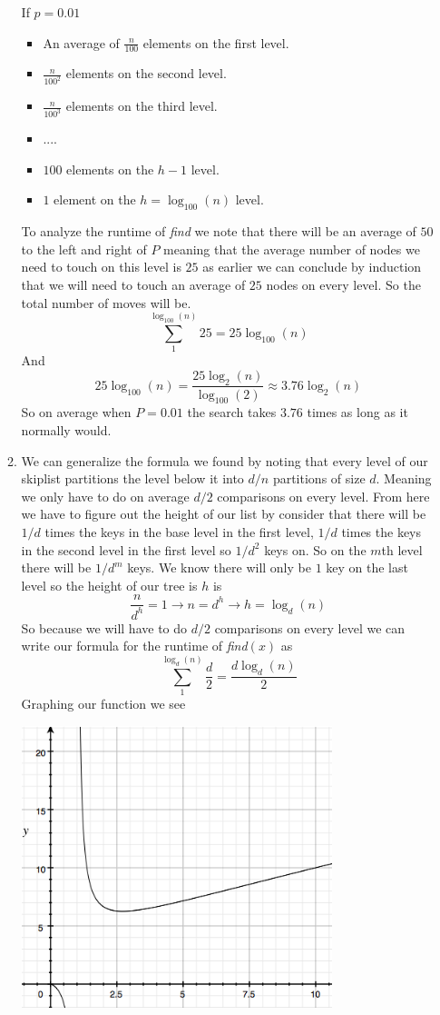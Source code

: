 \documentclass[11pt]{article}
\begin{document}
\begin{enumerate}
\begin{enumerate}
\begin{itemize}
		\end{itemize}
		If $p = 0.01$ 
		\begin{itemize}
		\item An average of $\frac{n}{100}$ elements on the first level.
		\item $\frac{n}{100^2}$ elements on the second level.
		\item $\frac{n}{100^3}$ elements on the third level.
		\item ....
		\item $100$ elements on the $h -1$ level.
		\item $1$ element on the $h = \log_{100}(n)$ level.
		\end{itemize}
			To analyze the runtime
			of \textit{find} we note that there will be an average
			of $50$ to the left and right of $P$ meaning that the
			average number of nodes we need to touch on this level
			is $25$ as earlier we can conclude by induction that we
			will need to touch an average of $25$ nodes on every
			level. So the total number of moves will be.
				$$\sum_1^{\log_{100}(n)}25 = 25\log_{100}(n) $$
			And 
			$$25\log_{100}(n) = \frac{25 \log_2(n)}{\log_{100}(2)}
			\approx 3.76\log_2(n)$$
			So on average when $P = 0.01$ the search takes $3.76$
			times as long as it normally would.
		\item We can generalize the formula we found by noting that every level of
			our skiplist partitions the level below it into $d/n$
			partitions of size $d$. Meaning we only have to do on
			average $d/2$ comparisons on every level. 
			From here we have to figure out the height of our list
			by consider that there will be $1/d$ times the keys in
			the base level in the first level, $1/d$ times the keys
			in the second level in the first level so $1/d^2$ keys
			on. So on the $m$th level there will be $1/d^m$ keys.
			We know there will only be $1$ key on the last level so
			the height of our tree is $h$ is
			$$\frac{n}{d^h} = 1 \rightarrow n = d^h \rightarrow h = \log_d(n)$$
			So because we will have to do $d/2$ comparisons on every
			level we can write our formula for the runtime of
			\textit{find}$(x)$ as 
			$$\sum_1^{\log_d(n)}\frac{d}{2}= \frac{d\log_d(n)}{2}$$
			Graphing our function we see
		\begin{center}
		\includegraphics[width=0.75\textwidth]{images/fig3}

\end{center}
\end{enumerate}
\end{enumerate}
\end{document}
